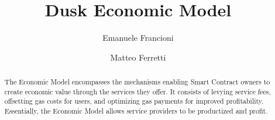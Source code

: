 \documentclass[twocolumn, nofootinbib]{revtex4-2}
\begin{document}
    \title{Dusk Economic Model}
    \author{Emanuele Francioni}
    \author{Matteo Ferretti}

    \begin{abstract}
        The Economic Model encompasses the mechanisms enabling Smart Contract
        owners to create economic value through the services they offer.
        It consists of levying service fees, offsetting gas costs for users,
        and optimizing gas payments for improved profitability. Essentially, the
        Economic Model allows service providers to be productized and profit.
    \end{abstract}

    \maketitle
\end{document}
